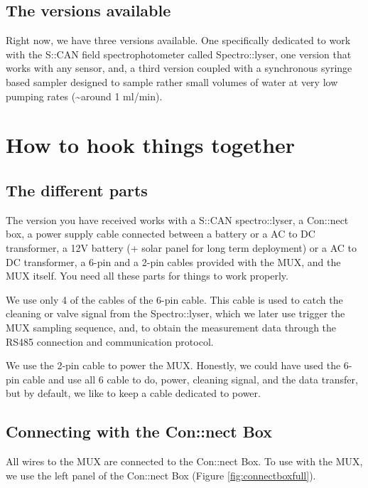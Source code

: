 \documentclass[]{book}
\begin{document}
\hypertarget{the-versions-available}{%
\section{The versions available}\label{the-versions-available}}

Right now, we have three versions available. One specifically dedicated to work with the S::CAN field spectrophotometer called Spectro::lyser, one version that works with any sensor, and, a third version coupled with a synchronous syringe based sampler designed to sample rather small volumes of water at very low pumping rates (\textasciitilde{}around 1 ml/min).

\hypertarget{intro}{%
\chapter{How to hook things together}\label{intro}}

\hypertarget{the-different-parts}{%
\section{The different parts}\label{the-different-parts}}

The version you have received works with a S::CAN spectro::lyser, a Con::nect box, a power supply cable connected between a battery or a AC to DC transformer, a 12V battery (+ solar panel for long term deployment) or a AC to DC transformer, a 6-pin and a 2-pin cables provided with the MUX, and the MUX itself. You need all these parts for things to work properly.

We use only 4 of the cables of the 6-pin cable. This cable is used to catch the cleaning or valve signal from the Spectro::lyser, which we later use trigger the MUX sampling sequence, and, to obtain the measurement data through the RS485 connection and communication protocol.

We use the 2-pin cable to power the MUX. Honestly, we could have used the 6-pin cable and use all 6 cable to do, power, cleaning signal, and the data transfer, but by default, we like to keep a cable dedicated to power.

\hypertarget{connecting-with-the-connect-box}{%
\section{Connecting with the Con::nect Box}\label{connecting-with-the-connect-box}}

All wires to the MUX are connected to the Con::nect Box. To use with the MUX, we use the left panel of the Con::nect Box (Figure \ref{fig:connectboxfull}).
\end{document}
